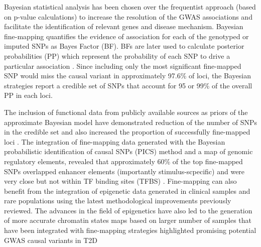 Bayesian statistical analysis has been chosen over the frequentist approach (based on p-value calculations) to increase the resolution of the GWAS associations and facilitate the identification of relevant genes and disease mechanism. Bayesian fine-mapping quantifies the evidence of association for each of the genotyped or imputed SNPs as Bayes Factor (BF). BFs are later used to calculate posterior probabilities (PP) which represent the probability of each SNP to drive a particular association \parencite{Wakefield2007}. Since including only the most significant fine-mapped SNP would miss the causal variant in approximately 97.6\% of loci, the Bayesian strategies report a credible set of SNPs that account for 95 or 99\% of the overall PP in each loci\parencite{Bunt2015}. 
 

The inclusion of functional data from publicly available sources as priors of the approximate Bayesian model have demonstrated reduction of the number of SNPs in the credible set and also increased the proportion of successfully fine-mapped loci \parencite{Bunt2015, Kichaev2015}. The integration of fine-mapping data generated with the Bayesian probabilistic identification of causal SNPs (PICS) method and a map of genomic regulatory elements, revealed that approximately 60\% of the top fine-mapped SNPs overlapped enhancer elements (importantly stimulus-scpecific) and were very close but not within TF binding sites (TFBS) \parencite{Farh2015}. Fine-mapping can also benefit from the integration of epigenetic data generated in clinical samples and rare populations using the latest methodological improvements previously reviewed. The advances in the field of epigenetics have also led to the generation of more accurate chromatin states maps based on larger number of samples that have been integrated with fine-mapping strategies highlighted promising potential GWAS causal variants in T2D \parencite{Thurner2018} 


